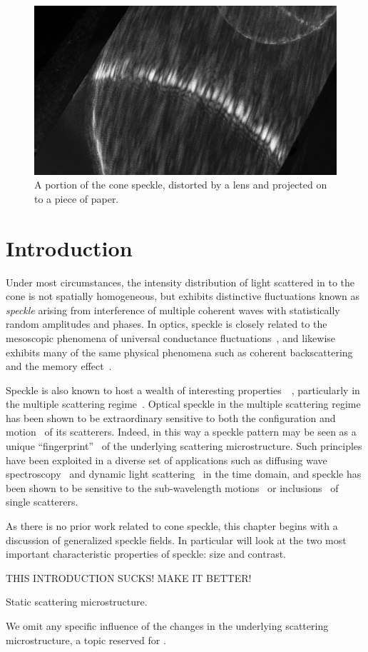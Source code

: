\begin{figure}[ht]
\centering
\includegraphics[keepaspectratio,width=15cm]{speckle/figures/Ag_LaSFN9_cone_lens11_cam-8899.jpg}
\caption{A portion of the cone speckle, distorted by a lens and projected on to a piece of paper.}
\label{fig:examplespeckle}
\end{figure}
\section{Introduction}
Under most circumstances, the intensity distribution of light
scattered in to the cone is not spatially homogeneous, but exhibits
distinctive fluctuations known as \textit{speckle}
arising from interference of multiple coherent waves with
statistically random amplitudes and phases.  In optics, speckle is closely
related to the mesoscopic phenomena of universal conductance
fluctuations~\cite{lee1985universal}, and likewise exhibits many of the
same physical phenomena such as coherent
backscattering~\cite{akkermans1986coherent} and the memory
effect~\cite{freund1988memory}.

Speckle is also known to host a wealth of interesting
properties~\cite{goodman1975statistical}~\cite{freund19981001},
particularly in the multiple scattering regime~\cite{feng1986sensitivity}.
Optical speckle in the multiple scattering regime has been shown to be
extraordinary sensitive to both the configuration and
motion~\cite{berkovits1994correlations} of its scatterers.  Indeed, in this
way a speckle pattern may be seen as a unique
``fingerprint''~\cite{ravikanth2001physical} of the underlying scattering
microstructure.  Such principles have been exploited in a diverse set of
applications such as diffusing wave spectroscopy~\cite{pine1988diffusing}
and dynamic light scattering~\cite{berne2000dynamic} in the time domain,
and speckle has been shown to be sensitive to the sub-wavelength
motions~\cite{berkovits1991sensitivity} or
inclusions~\cite{berkovits1990theory} of single scatterers.

As there is no prior work related to cone speckle, this chapter begins with
a discussion of generalized speckle fields.  In particular will look at the
two most important characteristic properties of speckle: size and contrast.  

THIS INTRODUCTION SUCKS!  MAKE IT BETTER!

Static scattering microstructure.

We omit any specific influence of the changes in the underlying scattering
microstructure, a topic reserved for .
